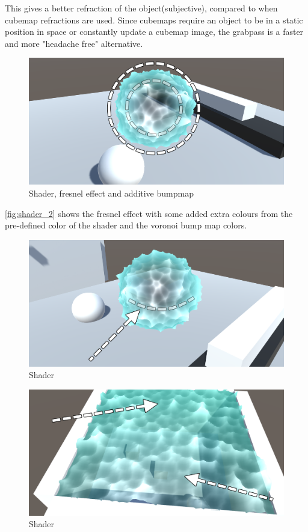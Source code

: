 \documentclass{article}
\begin{document}
This gives a better refraction of the object(subjective), compared to when cubemap refractions are used. Since cubemaps require an object to be in a static position in space or constantly update a cubemap image, the grabpass is a faster and more "headache free" alternative.\\


\begin{figure}[H]
    \centering
    \includegraphics[width=\textwidth]{img/shader_2}
    \caption{Shader, fresnel effect and additive bumpmap}
    \label{fig:shader_2}
\end{figure}
\autoref{fig:shader_2} shows the fresnel effect with some added extra colours from the pre-defined color of the shader and the voronoi bump map colors.

\begin{figure}[H]
    \centering
    \includegraphics[width=\textwidth]{img/shader_3}
    \caption{Shader}
    \label{fig:shader_3}
\end{figure}
\begin{figure}[H]
    \centering
    \includegraphics[width=\textwidth]{img/shader_4}
    \caption{Shader}
    \label{fig:shader_4}
\end{figure}
\end{document}
